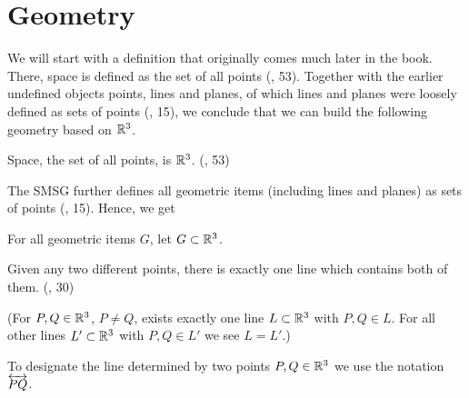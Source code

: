 \chapter{Geometry}

We will start with a definition that originally comes much later in the book.
There, space is defined as the set of all points (\cite{SMSGGeometry}, 53).
Together with the earlier undefined objects points, lines and planes, of which lines and planes were loosely defined as sets of points (\cite{SMSGGeometry}, 15), we conclude that we can build the following geometry based on $\mathbb{R}^3$.


\begin{definition}[Space]\label{def:Space}
  \leanok
    Space, the set of all points, is $\mathbb{R}^3$. (\cite{SMSGGeometry}, 53)
\end{definition}

The SMSG further defines all geometric items (including lines and planes) as sets of points (\cite{SMSGGeometry}, 15).
Hence, we get

\begin{definition}\label{def:GeomItems}
  \leanok
    For all geometric items $G$, let $G \subset \mathbb{R}^3$.
\end{definition}


\begin{definition}[Postulate 1]\label{def:Postulate_1}
  \leanok
  Given any two different points, there is exactly one line which contains both of them. (\cite{SMSGGeometry}, 30)

  (For $P,Q \in \mathbb{R}^3$, $P \ne Q$, exists exactly one line $L \subset \mathbb{R}^3$ with $P,Q \in L$.
  For all other lines $L' \subset \mathbb{R}^3$ with $P,Q \in L'$ we see $L=L'$.)
\end{definition}
  To designate the line determined by two points $P,Q \in \mathbb{R}^3$ we use the notation $\overleftrightarrow{PQ}$.


